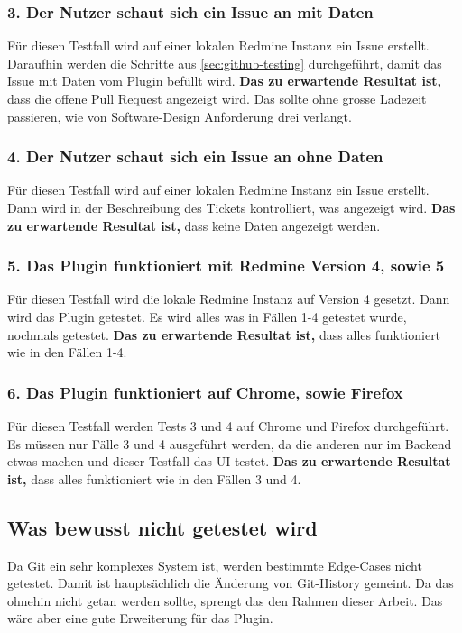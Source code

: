 \subsubsection{3. Der Nutzer schaut sich ein Issue an mit Daten}
Für diesen Testfall wird auf einer lokalen Redmine Instanz ein Issue erstellt. Daraufhin werden die Schritte aus
\ref{sec:github-testing} durchgeführt, damit das Issue mit Daten vom Plugin befüllt wird. \newline
\textbf{Das zu erwartende Resultat ist,} dass die offene Pull Request angezeigt wird. Das sollte ohne grosse Ladezeit passieren, wie von 
Software-Design Anforderung drei verlangt.

\subsubsection{4. Der Nutzer schaut sich ein Issue an ohne Daten}
Für diesen Testfall wird auf einer lokalen Redmine Instanz ein Issue erstellt. Dann wird in der Beschreibung des Tickets
kontrolliert, was angezeigt wird. \newline
\textbf{Das zu erwartende Resultat ist,} dass keine Daten angezeigt werden.

\subsubsection{5. Das Plugin funktioniert mit Redmine Version 4, sowie 5}
Für diesen Testfall wird die lokale Redmine Instanz auf Version 4 gesetzt. Dann wird das Plugin getestet. Es wird
alles was in Fällen 1-4 getestet wurde, nochmals getestet. \newline
\textbf{Das zu erwartende Resultat ist,} dass alles funktioniert wie in den Fällen 1-4.

\subsubsection{6. Das Plugin funktioniert auf Chrome, sowie Firefox}
Für diesen Testfall werden Tests 3 und 4 auf Chrome und Firefox durchgeführt. Es müssen nur Fälle 3 und 4
ausgeführt werden, da die anderen nur im Backend etwas machen und dieser Testfall das UI testet. \newline
\textbf{Das zu erwartende Resultat ist,} dass alles funktioniert wie in den Fällen 3 und 4.

\subsection{Was bewusst nicht getestet wird}
Da Git ein sehr komplexes System ist, werden bestimmte Edge-Cases nicht getestet. Damit ist hauptsächlich
die Änderung von Git-History gemeint. Da das ohnehin nicht getan werden sollte, sprengt das den Rahmen
dieser Arbeit. Das wäre aber eine gute Erweiterung für das Plugin.
